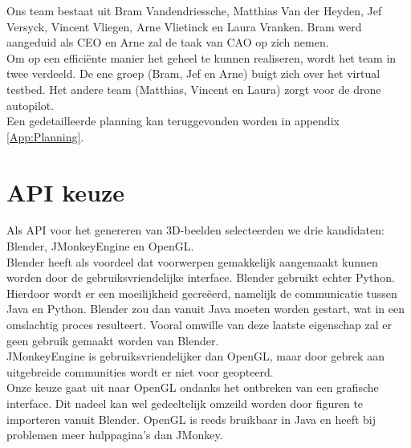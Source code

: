 \documentclass{peno-opdracht1}
\begin{document}
\maketitle

\noindent
	Ons team bestaat uit Bram Vandendriessche, Matthias Van der Heyden, Jef Versyck, Vincent Vliegen, Arne Vlietinck en Laura Vranken. Bram werd aangeduid als CEO en Arne zal de taak van CAO op zich nemen. \\
	Om op een effici\"ente manier het geheel te kunnen realiseren, wordt het team in twee verdeeld. De ene groep (Bram, Jef en Arne) buigt zich over het virtual testbed. Het andere team  (Matthias, Vincent en Laura) zorgt voor de drone autopilot.\\
	Een gedetailleerde planning kan teruggevonden worden in appendix \ref{App:Planning}.

\section{API keuze}
Als API voor het genereren van 3D-beelden selecteerden we drie kandidaten: Blender, JMonkeyEngine en OpenGL.\\
Blender heeft als voordeel dat voorwerpen gemakkelijk aangemaakt kunnen worden door de gebruiksvriendelijke interface. Blender gebruikt echter Python. Hierdoor wordt er een moeilijkheid gecre\"eerd, namelijk de \mbox{communicatie} tussen Java en Python. Blender zou dan vanuit Java moeten worden gestart, wat in een omslachtig proces resulteert. Vooral omwille van deze laatste eigenschap zal er geen gebruik gemaakt worden van Blender. \\
JMonkeyEngine is gebruiksvriendelijker dan OpenGL, maar door gebrek aan uitgebreide communities wordt er niet voor geopteerd.\\
Onze keuze gaat uit naar OpenGL ondanks het ontbreken van een grafische interface. Dit nadeel kan wel gedeeltelijk omzeild worden door figuren te importeren vanuit Blender. OpenGL is reeds bruikbaar in Java en heeft bij problemen meer hulppagina’s dan JMonkey.
\end{document}
